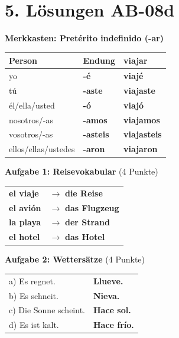\documentclass[11pt, a4paper]{article}
\newcommand{\fachfarbe}{spanisch}
\newcommand{\loesung}[1]{\textcolor{loesung}{\textbf{#1}}}
\newcommand{\es}[1]{\textcolor{\fachfarbe}{\textbf{#1}}}
\begin{document}

\section*{5. Lösungen AB-08d}

\textbf{Merkkasten: Pretérito indefinido (-ar)}

\begin{tabular}{|l|l|l|}
\hline
\textbf{Person} & \textbf{Endung} & \textbf{viajar} \\
\hline
yo & \loesung{-é} & \loesung{viajé} \\
tú & \loesung{-aste} & \loesung{viajaste} \\
él/ella/usted & \loesung{-ó} & \loesung{viajó} \\
nosotros/-as & \loesung{-amos} & \loesung{viajamos} \\
vosotros/-as & \loesung{-asteis} & \loesung{viajasteis} \\
ellos/ellas/ustedes & \loesung{-aron} & \loesung{viajaron} \\
\hline
\end{tabular}

\vspace{1em}

\textbf{Aufgabe 1: Reisevokabular} (4 Punkte)

\begin{tabular}{ll}
\es{el viaje} & $\rightarrow$ \loesung{die Reise} \\
\es{el avión} & $\rightarrow$ \loesung{das Flugzeug} \\
\es{la playa} & $\rightarrow$ \loesung{der Strand} \\
\es{el hotel} & $\rightarrow$ \loesung{das Hotel} \\
\end{tabular}

\vspace{1em}

\textbf{Aufgabe 2: Wettersätze} (4 Punkte)

\begin{tabular}{ll}
a) Es regnet. & \loesung{Llueve.} \\
b) Es schneit. & \loesung{Nieva.} \\
c) Die Sonne scheint. & \loesung{Hace sol.} \\
d) Es ist kalt. & \loesung{Hace frío.} \\
\end{tabular}
\end{document}
